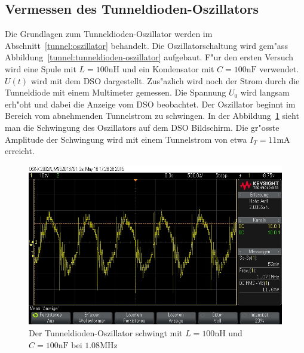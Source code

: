 \begin{refsection}


\section{Vermessen des Tunneldioden-Oszillators}

Die Grundlagen zum Tunneldioden-Oszillator werden im Abschnitt~\ref{tunnel:oszillator} behandelt. 
Die Oszillatorschaltung wird gem"ass Abbildung~\ref{tunnel:tunneldioden-oszillator} aufgebaut. 
F"ur den ersten Versuch wird eine Spule mit $L=100\text{nH}$ und ein Kondensator mit $C=100\text{nF}$ verwendet. 
$U(t)$ wird mit dem DSO dargestellt. 
Zus"azlich wird noch der Strom durch die Tunneldiode mit einem Multimeter gemessen. 
Die Spannung $U_0$ wird langsam erh"oht und dabei die Anzeige vom DSO beobachtet. 
Der Oszillator beginnt im Bereich vom abnehmenden Tunnelstrom zu schwingen. 
In der Abbildung~\ref{tunnel:oszi1} sieht man die Schwingung des Oszillators auf dem DSO Bildschirm. 
Die gr"osste Amplitude der Schwingung wird mit einem Tunnelstrom von etwa $I_T = 11\text{mA}$ erreicht.

\begin{figure}	%
\centering
\includegraphics[width=\hsize]{tunneldiode/images/Oszi_1.jpg}
\caption{Der Tunneldioden-Oszillator schwingt mit $L = 100\text{nH}$ und $C=100\text{nF}$ bei $1.08\text{MHz}$
\label{tunnel:oszi1}}
\end{figure}


\end{refsection}
